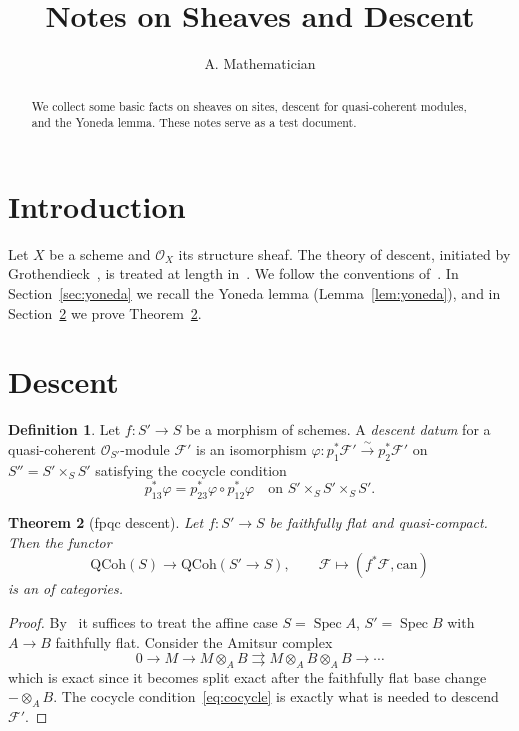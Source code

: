 \documentclass[11pt]{amsart}
\title{Notes on Sheaves and Descent}
\author{A. Mathematician}
\newtheorem{theorem}{Theorem}[section]
\theoremstyle{definition}
\newtheorem{definition}[theorem]{Definition}
\theoremstyle{remark}
\newcommand{\Spec}{\operatorname{Spec}}
\newcommand{\cO}{\mathcal{O}}
\newcommand{\cF}{\mathcal{F}}
\begin{document}
\maketitle

\begin{abstract}
We collect some basic facts on sheaves on sites, descent for quasi-coherent
modules, and the Yoneda lemma. These notes serve as a test document.
\end{abstract}

\tableofcontents

\section{Introduction}\label{sec:intro}
Let $X$ be a scheme and $\cO_X$ its structure sheaf. The theory of descent,
initiated by Grothendieck~\cite{SGA1}, is treated at length in~\cite{Vistoli}.
We follow the conventions of~\cite{Stacks}. In Section~\ref{sec:yoneda} we
recall the Yoneda lemma (Lemma~\ref{lem:yoneda}), and in
Section~\ref{sec:descent} we prove Theorem~\ref{thm:fpqc}.



\section{Descent}\label{sec:descent}
\begin{definition}\label{def:descent-datum}
Let $f\colon S'\to S$ be a morphism of schemes. A \emph{descent datum} for a
quasi-coherent $\cO_{S'}$-module $\cF'$ is an isomorphism
$\varphi\colon p_1^*\cF'\xrightarrow{\sim}p_2^*\cF'$ on $S''=S'\times_S S'$
satisfying the cocycle condition
\begin{equation}\label{eq:cocycle}
p_{13}^*\varphi = p_{23}^*\varphi\circ p_{12}^*\varphi
\quad\text{on } S'\times_S S'\times_S S'.
\end{equation}
\end{definition}

\begin{theorem}[fpqc descent]\label{thm:fpqc}
Let $f\colon S'\to S$ be faithfully flat and quasi-compact. Then the functor
\[
\mathrm{QCoh}(S)\longrightarrow \mathrm{QCoh}(S'\to S),\qquad
\cF\longmapsto (f^*\cF,\mathrm{can})
\]
is an \equivalnce of categories.
\end{theorem}

\begin{proof}
By~\cite[Tag 023N]{Stacks} it suffices to treat the affine case
$S=\Spec A$, $S'=\Spec B$ with $A\to B$ faithfully flat. Consider the
Amitsur complex
\begin{equation}\label{eq:amitsur}
0\to M\to M\otimes_A B\rightrightarrows M\otimes_A B\otimes_A B
\to\cdots
\end{equation}
which is exact since it becomes split exact after the faithfully flat base
change $-\otimes_A B$. The cocycle condition~\eqref{eq:cocycle} is exactly
what is needed to descend $\cF'$.
\end{proof}
\end{document}
